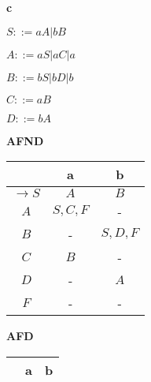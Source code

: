\documentclass[ ]{article}
\begin{document}
		\newpage
		\textbf{c}
		
		$S ::= aA | bB$
		
		$A ::= aS | aC | a$
		
		$B ::= bS | bD | b$
		
		$C ::= aB$
		
		$D ::= bA$
		
\begin{center}
    \begin{minipage}[t]{0.48\textwidth} %
        \centering %
        \textbf{AFND}\\ %
        \vspace{0.2cm} %
        \begin{tabular}{|c|c|c|} %
            \toprule %
            & a & b \\
            \midrule %
		$\to S$ & $A$ & $B$\\
		$A$ & $S,C,F$ & -\\
		$B$ & - & $S,D,F$\\
		$C$ & $B$ & -\\
		$D$ & - & $A$\\
		$F$ & - & -\\
            \bottomrule %
        \end{tabular}
    \end{minipage}%
    \hfill %
    \begin{minipage}[t]{0.48\textwidth} %
        \centering %
        \textbf{AFD}\\ %
        \vspace{0.2cm} %
        \begin{tabular}{|l|c|c|} %
            \toprule %
            & a & b \\
            \midrule %

            \bottomrule %
        \end{tabular}
    \end{minipage}
\end{center}
\end{document}
